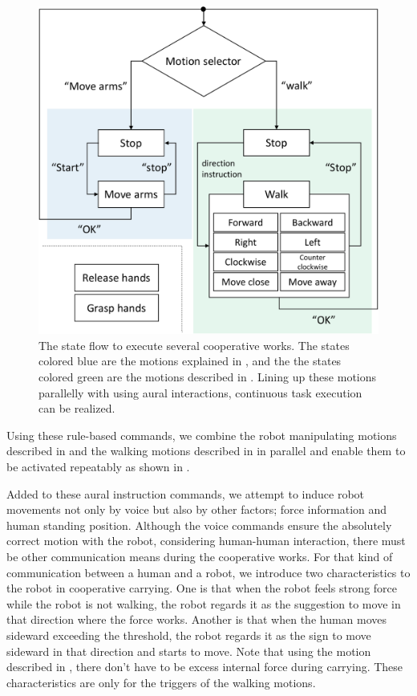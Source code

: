 \begin{figure}[htbp]
  \begin{center}
    \includegraphics[width=0.80\columnwidth]{figs/motion_selector3}
    \caption{The state flow to execute several cooperative works. The states colored blue are the motions explained in , and the the states colored green are the motions described in . Lining up these motions parallelly with using aural interactions, continuous task execution can be realized.}
    \label{figure:speech_flow}
  \end{center}
\end{figure}

Using these rule-based commands, we combine the robot manipulating motions described in  and the walking motions described in  in parallel and enable them to be activated repeatably as shown in .

Added to these aural instruction commands, we attempt to induce robot movements not only by voice but also by other factors; force information and human standing position. Although the voice commands ensure the absolutely correct motion with the robot, considering human-human interaction, there must be other communication means during the cooperative works. For that kind of communication between a human and a robot, we introduce two characteristics to the robot in cooperative carrying. One is that when the robot feels strong force while the robot is not walking, the robot regards it as the suggestion to move in that direction where the force works. Another is that when the human moves sideward exceeding the threshold, the robot regards it as the sign to move sideward in that direction and starts to move. Note that using the motion described in , there don't have to be excess internal force during carrying. These characteristics are only for the triggers of the walking motions.

